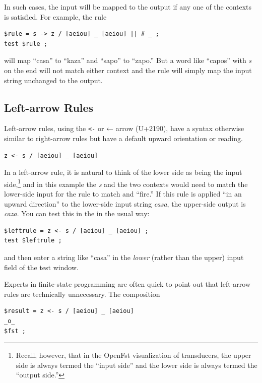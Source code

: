 \noindent
In such cases, the input will be mapped to the output if any one of the
contexts
is satisfied.  For example, the rule

\begin{Verbatim}
$rule = s -> z / [aeiou] _ [aeiou] || # _ ;
test $rule ;
\end{Verbatim}

\noindent
will map ``casa'' to ``kaza'' and ``sapo'' to ``zapo.''  But a word like
``capos'' with \emph{s} on the end will not match either context and the
rule will simply map the input string unchanged to the output.

\subsection{Left-arrow Rules}

Left-arrow rules, using the \texttt{<-} or ← arrow (U+2190), 
have a syntax otherwise similar to right-arrow
rules but have a default upward orientation or reading.

\begin{Verbatim}
z <- s / [aeiou] _ [aeiou]
\end{Verbatim}

\noindent
In a left-arrow rule, it is natural to think of the lower side as being the input side,\footnote{Recall,
however, that in the OpenFst visualization of transducers, the upper side is always termed the ``input
side'' and the lower side is always termed the ``output side.''} and in this example the
\emph{s} and
the two contexts would need to match the lower-side input for the rule
to match and ``fire.''  If this rule is
applied ``in an upward direction'' to the lower-side input string \emph{casa}, the upper-side output
is \emph{caza}.  You can test this in the  in the usual way:


\begin{Verbatim}
$leftrule = z <- s / [aeiou] _ [aeiou] ;
test $leftrule ;
\end{Verbatim}

\noindent
and then enter a string like ``casa'' in the \emph{lower} (rather than
the upper) input field of the test window.


Experts in finite-state programming are often quick to point out that left-arrow rules
are technically unnecessary.  The composition

\begin{Verbatim}
$result = z <- s / [aeiou] _ [aeiou] 
_o_ 
$fst ;
\end{Verbatim}

